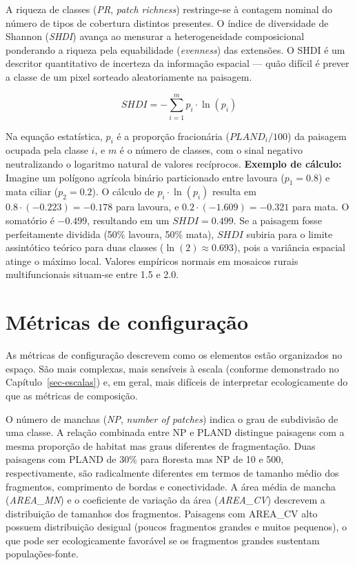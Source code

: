 \documentclass[
  portuguese,
  11pt,
  a4paper,
  open=any]{scrbook}
\begin{document}
A riqueza de classes (\emph{PR}, \emph{patch richness}) restringe-se à
contagem nominal do número de tipos de cobertura distintos presentes. O
índice de diversidade de Shannon (\emph{SHDI}) avança ao mensurar a
heterogeneidade composicional ponderando a riqueza pela equabilidade
(\emph{evenness}) das extensões. O SHDI é um descritor quantitativo de
incerteza da informação espacial --- quão difícil é prever a classe de
um pixel sorteado aleatoriamente na paisagem.

\[
SHDI = -\sum_{i=1}^{m} p_i \cdot \ln(p_i)
\]

Na equação estatística, \(p_i\) é a proporção fracionária
(\(PLAND_i / 100\)) da paisagem ocupada pela classe \(i\), e \(m\) é o
número de classes, com o sinal negativo neutralizando o logaritmo
natural de valores recíprocos. \textbf{Exemplo de cálculo:} Imagine um
polígono agrícola binário particionado entre lavoura (\(p_1 = 0.8\)) e
mata ciliar (\(p_2 = 0.2\)). O cálculo de \(p_i \cdot \ln(p_i)\) resulta
em \(0.8 \cdot (-0.223) = -0.178\) para lavoura, e
\(0.2 \cdot (-1.609) = -0.321\) para mata. O somatório é \(-0.499\),
resultando em um \(SHDI = 0.499\). Se a paisagem fosse perfeitamente
dividida (50\% lavoura, 50\% mata), \(SHDI\) subiria para o limite
assintótico teórico para duas classes (\(\ln(2) \approx 0.693\)), pois a
variância espacial atinge o máximo local. Valores empíricos normais em
mosaicos rurais multifuncionais situam-se entre 1.5 e 2.0.

\section{Métricas de
configuração}\label{muxe9tricas-de-configurauxe7uxe3o}

As métricas de configuração descrevem como os elementos estão
organizados no espaço. São mais complexas, mais sensíveis à escala
(conforme demonstrado no Capítulo~\ref{sec-escalas}) e, em geral, mais
difíceis de interpretar ecologicamente do que as métricas de composição.

O número de manchas (\emph{NP}, \emph{number of patches}) indica o grau
de subdivisão de uma classe. A relação combinada entre NP e PLAND
distingue paisagens com a mesma proporção de habitat mas graus
diferentes de fragmentação. Duas paisagens com PLAND de 30\% para
floresta mas NP de 10 e 500, respectivamente, são radicalmente
diferentes em termos de tamanho médio dos fragmentos, comprimento de
bordas e conectividade. A área média de mancha (\emph{AREA\_MN}) e o
coeficiente de variação da área (\emph{AREA\_CV}) descrevem a
distribuição de tamanhos dos fragmentos. Paisagens com AREA\_CV alto
possuem distribuição desigual (poucos fragmentos grandes e muitos
pequenos), o que pode ser ecologicamente favorável se os fragmentos
grandes sustentam populações-fonte.
\end{document}
